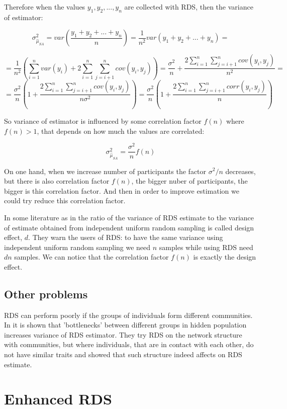 \documentclass[12pt]{report}
\begin{document}
Therefore when the values $y_1, y_2, ..., y_n$ are collected with RDS, then the variance of estimator:

$$ \sigma^2_{\hat{\mu}_{SA}} = var\left( \frac{y_1 + y_2 + ... + y_n}{n}\right)=\frac{1}{n^2} var(y_1 + y_2 + ... + y_n) =$$

$$= \frac{1}{n^2} \left(\sum_{i = 1}^n var(y_i) + 2\sum_{i=1}^n \sum_{j=i+1}^n cov(y_i, y_j)\right)= \frac{\sigma^2}{n} + \frac{2\sum_{i=1}^n \sum_{j=i+1}^n cov(y_i, y_j)}{n^2} = $$
$$ = \frac{\sigma^2}{n} \left(1 + \frac{2\sum_{i=1}^n \sum_{j=i+1}^n cov(y_i, y_j)}{n\sigma^2}\right) = \frac{\sigma^2}{n} \left(1 + \frac{2\sum_{i=1}^n \sum_{j=i+1}^n corr(y_i, y_j)}{n}\right)$$

So variance of estimator is influenced by some correlation factor $f(n)$ where$f(n) > 1$, that depends on how much the values are correlated:

$$ \sigma^2_{\hat{\mu}_{SA}} = \frac{\sigma^2}{n} f(n)$$

On one hand, when we increase number of participants the factor $\sigma^2/n$ decreases, but there is also correlation factor $f(n)$, the bigger nuber of participants, the bigger is this correlation factor. And then in order to improve estimation we could try reduce this correlation factor.

In some literature as in  \cite{goel2010assessing} the ratio of the variance of RDS estimate to the variance of estimate obtained from independent uniform random sampling is called design effect, $d$. They warn the users of RDS: to have the same variance using independent uniform random sampling we need $n$ samples while using RDS need $dn$ samples. We can notice that the correlation factor $f(n)$ is exactly the design effect.


\subsection{Other problems}

RDS can perform poorly if the groups of individuals form different communities. In \cite{goel2009respondent} it is shown that 'bottlenecks' between different groups in hidden population increases variance of RDS estimator. They try RDS on the network structure with communities, but where individuals, that are in contact with each other, do not have similar traits and showed that such structure indeed affects on RDS estimate. 


\section{Enhanced RDS}
\label{sec:Enhanced RDS}
\end{document}
